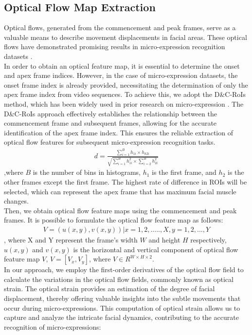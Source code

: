 \documentclass[review,12pt, 3p]{elsarticle}
\begin{document}
\subsection{Optical Flow Map Extraction}
Optical flows, generated from the commencement and peak frames, serve as a valuable means to describe movement displacements in facial areas. These optical flows have demonstrated promising results in micro-expression recognition datasets \cite{ref-9,ref-5}. \\
In order to obtain an optical feature map, it is essential to determine the onset and apex frame indices. However, in the case of micro-expression datasets, the onset frame index is already provided, necessitating the determination of only the apex frame index from video sequences. To achieve this, we adopt the D\&C-RoIs method, which has been widely used in prior research on micro-expression \cite{ref-9}. The D\&C-RoIs approach effectively establishes the relationship between the commencement frame and subsequent frames, allowing for the accurate identification of the apex frame index. This ensures the reliable extraction of optical flow features for subsequent micro-expression recognition tasks.
\begin{equation}
\begin{aligned}
d =\frac{\sum_{i=1}^{B} h_{1i} \times h_{h2i}}{\sqrt{\sum_{i=1}^{B} h_{1i}^2 \times \sum_{i=2}^{B} h_{2i}^2 }}
\end{aligned}
\label{apex-spotting}
\end{equation}
,where $B$ is the number of bins in histograms, $h_1$ is the first frame, and $h_2$ is the other frames except the first frame. The highest rate of difference in ROIs will be selected, which can represent the apex frame that has maximum facial muscle changes. \\
Then, we obtain optical flow feature maps using the commencement and peak frames. It is possible to formulate the optical flow feature map as follows:
\begin{equation}
\begin{aligned}
V ={(u(x, y), v(x,y)) | x = 1,2,....., X, y = 1,2, ..., Y}
\end{aligned}
\label{optical-u-v}
\end{equation}
, where X and Y represent the frame's width $W$ and height $H$ respectively, $u(x,y)$ and  $v(x,y)$  is the horizontal  and  vertical component of optical flow feature map $V$, $V = [V_x, V_y]$, where $V \in R^{W\times H \times 2}$.\\
In our approach, we employ the first-order derivatives of the optical flow field to calculate the variations in the optical flow fields, commonly known as optical strain. The optical strain provides an estimation of the degree of facial displacement, thereby offering valuable insights into the subtle movements that occur during micro-expressions. This computation of optical strain allows us to capture and analyze the intricate facial dynamics, contributing to the accurate recognition of micro-expressions:
\end{document}
